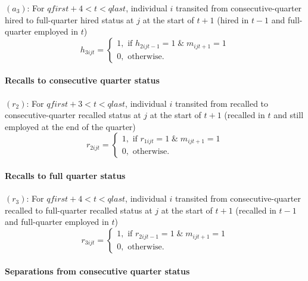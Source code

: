 $\left( a_{3}\right) $: For $qfirst+4<t<qlast$, individual $i$ transited
from consecutive-quarter hired to full-quarter hired status at $j$ at the
start of $t+1$ (hired in $t-1$ and full-quarter employed in $t$)%
\begin{equation}
h_{3ijt}=\left\{ 
\begin{array}{l}
1,\text{ if }h_{2ijt-1}=1\;\&\;m_{ijt+1}=1 \\ 
0,\text{ otherwise.}%
\end{array}%
\right.  \label{eq:h3ijt}
\end{equation}

\paragraph{Recalls to consecutive quarter status}

$\left( r_{2}\right)$: For $qfirst+3<t<qlast$, individual $i$ transited from
recalled to consecutive-quarter recalled status at $j$ at the start of $t+1$
(recalled in $t$ and still employed at the end of the quarter)%
\begin{equation}
r_{2ijt}=\left\{ 
\begin{array}{l}
1,\text{ if }r_{1ijt}=1\;\&\;m_{ijt+1}=1 \\ 
0,\text{ otherwise.}%
\end{array}%
\right.  \label{eq:r2ijt}
\end{equation}

\paragraph{Recalls to full quarter status}

$\left( r_{3}\right) $: For $qfirst+4<t<qlast$, individual $i$ transited
from consecutive-quarter recalled to full-quarter recalled status at $j$ at
the start of $t+1$ (recalled in $t-1$ and full-quarter employed in $t$)%
\begin{equation}
r_{3ijt}=\left\{ 
\begin{array}{l}
1,\text{ if }r_{2ijt-1}=1\;\&\;m_{ijt+1}=1 \\ 
0,\text{ otherwise.}%
\end{array}%
\right.  \label{eq:r3ijt}
\end{equation}

\paragraph{Separations from consecutive quarter status}

